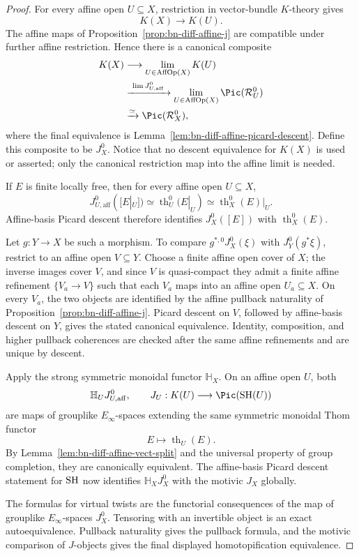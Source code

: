 \begin{proof}
For every affine open \(U\subseteq X\), restriction in vector-bundle
\(K\)-theory gives
\[
  K(X)\longrightarrow K(U).
\]
The affine maps of Proposition~\ref{prop:bn-diff-affine-j} are compatible under
further affine restriction.  Hence there is a canonical composite
\[
\begin{aligned}
  K(X)
  &\longrightarrow
  \lim_{U\in\operatorname{AffOp}(X)}K(U)\\
  &\xrightarrow{\ \lim J_{U,\mathrm{aff}}^0\ }
  \lim_{U\in\operatorname{AffOp}(X)}\Pic(\mathcal R_U^0)\\
  &\xrightarrow{\simeq}
  \Pic(\mathcal R_X^0),
\end{aligned}
\]
where the final equivalence is
Lemma~\ref{lem:bn-diff-affine-picard-descent}.  Define this composite to be
\(J_X^0\).  Notice that no descent equivalence for \(K(X)\) is used or
asserted; only the canonical restriction map into the affine limit is needed.

If \(E\) is finite locally free, then for every affine open \(U\subseteq X\),
\[
  J_{U,\mathrm{aff}}^0([E|_U])
  \simeq
  \operatorname{th}^0_U(E|_U)
  \simeq
  \operatorname{th}^0_X(E)|_U.
\]
Affine-basis Picard descent therefore identifies
\(J_X^0([E])\) with \(\operatorname{th}^0_X(E)\).

Let \(g:Y\to X\) be such a morphism.  To compare \(g^{*,0}J_X^0(\xi)\) with
\(J_Y^0(g^*\xi)\), restrict to an affine open \(V\subseteq Y\).  Choose a
finite affine open cover of \(X\); the inverse images cover \(V\), and since
\(V\) is quasi-compact they admit a finite affine refinement
\(\{V_a\to V\}\) such that each \(V_a\) maps into an affine open
\(U_a\subseteq X\).  On every \(V_a\), the two objects are identified by the
affine pullback naturality of Proposition~\ref{prop:bn-diff-affine-j}.  Picard
descent on \(V\), followed by affine-basis descent on \(Y\), gives the stated
canonical equivalence.  Identity, composition, and higher pullback coherences
are checked after the same affine refinements and are unique by descent.

Apply the strong symmetric monoidal functor \(\mathbb H_X\).  On an affine
open \(U\), both
\[
  \mathbb H_UJ_{U,\mathrm{aff}}^0,
  \qquad
  J_U:
  K(U)\longrightarrow\Pic(\SH(U))
\]
are maps of grouplike \(E_\infty\)-spaces extending the same symmetric
monoidal Thom functor
\[
  E\longmapsto\operatorname{th}_U(E).
\]
By Lemma~\ref{lem:bn-diff-affine-vect-split} and the universal property of
group completion, they are canonically equivalent.  The affine-basis Picard
descent statement for \(\mathrm{SH}\) now identifies
\(\mathbb H_XJ_X^0\) with the motivic \(J_X\) globally.

The formulas for virtual twists are the functorial consequences of the map of
grouplike \(E_\infty\)-spaces \(J_X^0\).  Tensoring with an invertible object
is an exact autoequivalence.  Pullback naturality gives the pullback formula,
and the motivic comparison of \(J\)-objects gives the final displayed
homotopification equivalence.
\end{proof}

